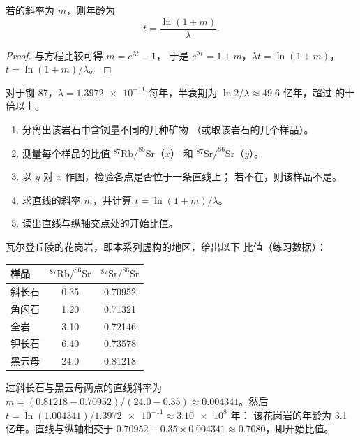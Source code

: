 \begin{proposition}[由斜率求年龄]\label{prop:g12:age-of-the-earth:slope}
若的斜率为 $m$，则年龄为
\[
  t = \frac{\ln(1+m)}{\lambda}.
\]
\end{proposition}

\begin{proof}
与方程比较可得 $m = e^{\lambda t} - 1$，
于是 $e^{\lambda t} = 1 + m$，$\lambda t = \ln(1+m)$，$t = \ln(1+m)/\lambda$。
\end{proof}

对于铷-87，$\lambda = \num{1.3972e-11}$ 每年，半衰期为
$\ln 2/\lambda \approx 49.6$ 亿年，超过
的十倍以上。

\begin{method}[用等时线给岩石定年]\label{met:g12:age-of-the-earth:isochron}
\begin{enumerate}
  \item 分离出该岩石中含铷量不同的几种矿物
        （或取该岩石的几个样品）。
  \item 测量每个样品的比值 $^{87}\mathrm{Rb}/^{86}\mathrm{Sr}$（$x$）
        和 $^{87}\mathrm{Sr}/^{86}\mathrm{Sr}$（$y$）。
  \item 以 $y$ 对 $x$ 作图，检验各点是否位于一条直线上；
        若不在，则该样品不是。
  \item 求直线的斜率 $m$，并计算 $t = \ln(1+m)/\lambda$。
  \item 读出直线与纵轴交点处的开始比值。
\end{enumerate}
\end{method}

\begin{example}[瓦尔登花岗岩]\label{ex:g12:age-of-the-earth:varden}
瓦尔登丘陵的花岗岩，即本系列虚构的地区，给出以下
比值（练习数据）：
\begin{center}
\small
\begin{tabular}{|l|c|c|}
\hline
样品 & $^{87}\mathrm{Rb}/^{86}\mathrm{Sr}$ & $^{87}\mathrm{Sr}/^{86}\mathrm{Sr}$ \\
\hline
斜长石 & 0.35 & 0.70952 \\
角闪石  & 1.20 & 0.71321 \\
全岩  & 3.10 & 0.72146 \\
钾长石  & 6.40 & 0.73578 \\
黑云母     & 24.0 & 0.81218 \\
\hline
\end{tabular}
\end{center}
过斜长石与黑云母两点的直线斜率为
$m = (0.81218 - 0.70952)/(24.0 - 0.35) \approx 0.004341$。然后
$t = \ln(1.004341)/\num{1.3972e-11} \approx \num{3.10e8}$ 年：
该花岗岩的年龄为 3.1 亿年。直线与纵轴相交于
$0.70952 - 0.35 \times 0.004341 \approx 0.7080$，即开始比值。
\end{example}

